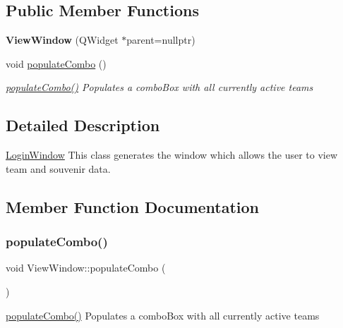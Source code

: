 \subsection*{Public Member Functions}
\begin{DoxyCompactItemize}
\item 
\mbox{\label{class_view_window_a6a50ff7682c6a5286212470306fbb72d}} 
{\bfseries View\+Window} (Q\+Widget $\ast$parent=nullptr)
\item 
void \mbox{\hyperlink{class_view_window_ae95bf3c78fb5374f9d4e62405db6d94c}{populate\+Combo}} ()
\begin{DoxyCompactList}\small\item\em \mbox{\hyperlink{class_view_window_ae95bf3c78fb5374f9d4e62405db6d94c}{populate\+Combo()}} Populates a combo\+Box with all currently active teams \end{DoxyCompactList}\end{DoxyCompactItemize}


\subsection{Detailed Description}
\mbox{\hyperlink{class_login_window}{Login\+Window}} This class generates the window which allows the user to view team and souvenir data. 

\subsection{Member Function Documentation}
\mbox{\label{class_view_window_ae95bf3c78fb5374f9d4e62405db6d94c}} 
\subsubsection{\texorpdfstring{populateCombo()}{populateCombo()}}
{\footnotesize\ttfamily void View\+Window\+::populate\+Combo (\begin{DoxyParamCaption}{ }\end{DoxyParamCaption})}



\mbox{\hyperlink{class_view_window_ae95bf3c78fb5374f9d4e62405db6d94c}{populate\+Combo()}} Populates a combo\+Box with all currently active teams 

